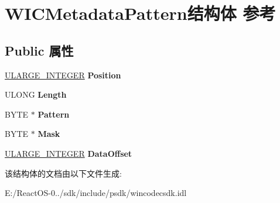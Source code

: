 \hypertarget{struct_w_i_c_metadata_pattern}{}\section{W\+I\+C\+Metadata\+Pattern结构体 参考}
\label{struct_w_i_c_metadata_pattern}
\subsection*{Public 属性}
\begin{DoxyCompactItemize}
\item 
\mbox{\label{struct_w_i_c_metadata_pattern_aa70a8a04da4ee40ba6067ba997344675}} 
\hyperlink{struct___u_l_a_r_g_e___i_n_t_e_g_e_r}{U\+L\+A\+R\+G\+E\+\_\+\+I\+N\+T\+E\+G\+ER} {\bfseries Position}
\item 
\mbox{\label{struct_w_i_c_metadata_pattern_aaf1623e635e3aa32bb1165c078fd83ba}} 
U\+L\+O\+NG {\bfseries Length}
\item 
\mbox{\label{struct_w_i_c_metadata_pattern_a6c3993744a921068f379b014322f93ad}} 
B\+Y\+TE $\ast$ {\bfseries Pattern}
\item 
\mbox{\label{struct_w_i_c_metadata_pattern_a44b1ae64293478021c89d1b10d87b9b9}} 
B\+Y\+TE $\ast$ {\bfseries Mask}
\item 
\mbox{\label{struct_w_i_c_metadata_pattern_a1f719ca2ea95ddf401d2a401c201a2cf}} 
\hyperlink{struct___u_l_a_r_g_e___i_n_t_e_g_e_r}{U\+L\+A\+R\+G\+E\+\_\+\+I\+N\+T\+E\+G\+ER} {\bfseries Data\+Offset}
\end{DoxyCompactItemize}


该结构体的文档由以下文件生成\+:\begin{DoxyCompactItemize}
\item 
E\+:/\+React\+O\+S-\/0../sdk/include/psdk/wincodecsdk.\+idl\end{DoxyCompactItemize}
